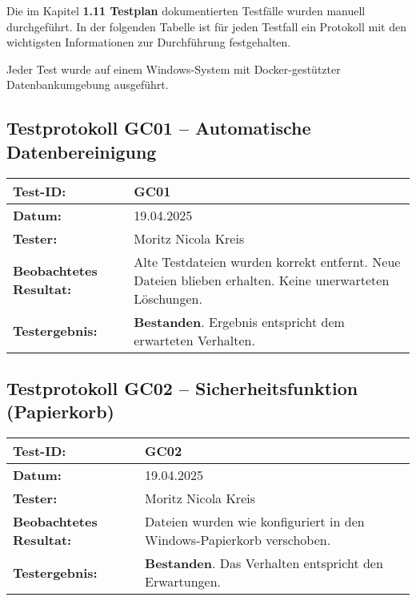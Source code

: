 
Die im Kapitel \textbf{1.11 Testplan} dokumentierten Testfälle wurden manuell durchgeführt. In der folgenden Tabelle ist für jeden Testfall ein Protokoll mit den wichtigsten Informationen zur Durchführung festgehalten.

Jeder Test wurde auf einem Windows-System mit Docker-gestützter Datenbankumgebung ausgeführt.

\subsection*{Testprotokoll GC01 – Automatische Datenbereinigung}
\begin{tabular}{|p{4cm}|p{10cm}|}
\hline
\textbf{Test-ID:} & GC01 \\
\hline
\textbf{Datum:} & 19.04.2025 \\
\hline
\textbf{Tester:} & Moritz Nicola Kreis \\
\hline
\textbf{Beobachtetes \newline Resultat:} & Alte Testdateien wurden korrekt entfernt. Neue Dateien blieben erhalten. Keine unerwarteten Löschungen. \\
\hline
\textbf{Testergebnis:} & \textbf{Bestanden}. Ergebnis entspricht dem erwarteten Verhalten. \\
\hline
\end{tabular}

\vspace{1em}

\subsection*{Testprotokoll GC02 – Sicherheitsfunktion (Papierkorb)}
\begin{tabular}{|p{4cm}|p{10cm}|}
\hline
\textbf{Test-ID:} & GC02 \\
\hline
\textbf{Datum:} & 19.04.2025 \\
\hline
\textbf{Tester:} & Moritz Nicola Kreis \\
\hline
\textbf{Beobachtetes \newline Resultat:} & Dateien wurden wie konfiguriert in den Windows-Papierkorb verschoben. \\
\hline
\textbf{Testergebnis:} & \textbf{Bestanden}. Das Verhalten entspricht den Erwartungen. \\
\hline
\end{tabular}

\vspace{1em}

